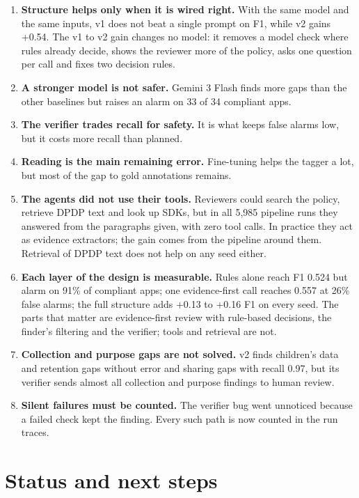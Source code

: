 \documentclass[11pt,a4paper]{article}
\begin{document}
\begin{enumerate}
  \item \textbf{Structure helps only when it is wired right.} With the same model and the same
        inputs, v1 does not beat a single prompt on F1, while v2 gains +0.54. The v1 to v2 gain
        changes no model: it removes a model check where rules already decide, shows the reviewer
        more of the policy, asks one question per call and fixes two decision rules.
  \item \textbf{A stronger model is not safer.} Gemini 3 Flash finds more gaps than the other
        baselines but raises an alarm on 33 of 34 compliant apps.
  \item \textbf{The verifier trades recall for safety.} It is what keeps false alarms low, but it
        costs more recall than planned.
  \item \textbf{Reading is the main remaining error.} Fine-tuning helps the tagger a lot, but most
        of the gap to gold annotations remains.
  \item \textbf{The agents did not use their tools.} Reviewers could search the policy, retrieve DPDP
        text and look up SDKs, but in all 5,985 pipeline runs they answered from the paragraphs
        given, with zero tool calls. In practice they act as evidence extractors; the gain comes
        from the pipeline around them. Retrieval of DPDP text does not help on any seed either.
  \item \textbf{Each layer of the design is measurable.} Rules alone reach F1 0.524 but alarm on
        91\% of compliant apps; one evidence-first call reaches 0.557 at 26\% false alarms; the
        full structure adds +0.13 to +0.16 F1 on every seed. The parts that matter are
        evidence-first review with rule-based decisions, the finder's filtering and the verifier;
        tools and retrieval are not.
  \item \textbf{Collection and purpose gaps are not solved.} v2 finds children's data and retention
        gaps without error and sharing gaps with recall 0.97, but its verifier sends almost all
        collection and purpose findings to human review.
  \item \textbf{Silent failures must be counted.} The verifier bug went unnoticed because a failed
        check kept the finding. Every such path is now counted in the run traces.
\end{enumerate}

\section{Status and next steps}
\end{document}
